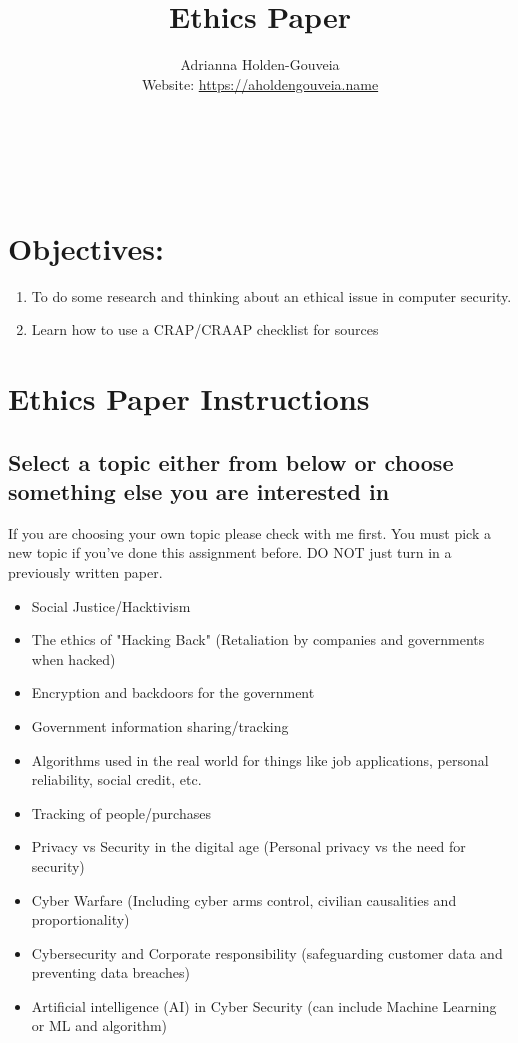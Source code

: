 \documentclass[12pt]{article}
\title{Ethics Paper}
\author{
        Adrianna Holden-Gouveia \\
        Website: \url{https://aholdengouveia.name}\\ 
        \date{\vspace{-5ex}}
        \faLinkedin{: aholdengouveia} \\
        \faGithub {: aholdengouveia} \\
        \faTwitter {: aholdengouveia} \\
        }
\begin{document}
    

\maketitle



\section*{Objectives:}
\begin{enumerate}
    \item To do some research and thinking about an ethical issue in computer security. 
    \item Learn how to use a CRAP/CRAAP checklist for sources
\end{enumerate}
\section*{Ethics Paper Instructions}


\subsection*{Select a topic either from below or choose something else you are interested in}
If you are choosing your own topic please check with me first.  You must pick a new topic if you've done this assignment before.  DO NOT just turn in a previously written paper.
        
    \begin{itemize}
        \item Social Justice/Hacktivism
        \item The ethics of "Hacking Back" (Retaliation by companies and governments when hacked)
        \item Encryption and backdoors for the government
        \item Government information sharing/tracking
        \item Algorithms used in the real world for things like job applications, personal reliability, social credit, etc.
        \item Tracking of people/purchases
        \item Privacy vs Security in the digital age (Personal privacy vs the need for security)
        \item Cyber Warfare (Including cyber arms control, civilian causalities and proportionality)
        \item Cybersecurity and Corporate responsibility (safeguarding customer data and preventing data breaches)
        \item Artificial intelligence (AI) in Cyber Security (can include Machine Learning or ML and algorithm)


    \end{itemize}
\end{document}
